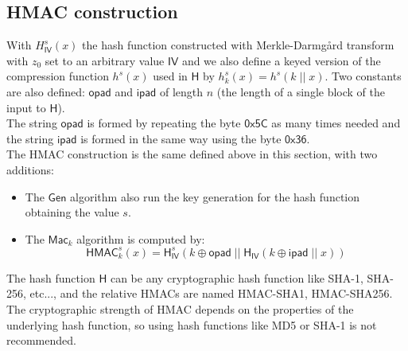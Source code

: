 \subsection{HMAC construction}
With $H^s_{\mathsf{IV}}(x)$ the hash function constructed with Merkle-Darmg\r{a}rd transform with $z_0$ set to an arbitrary value $\mathsf{IV}$ and we also define a keyed version of the compression function $h^s(x)$ used in $\mathsf{H}$ by $h^s_k(x) = h^s(k\;||\;x)$. Two constants are also defined: $\mathsf{opad}$ and $\mathsf{ipad}$ of length $n$ (the length of a single block of the input to $\mathsf{H}$).\\
The string $\mathsf{opad}$ is formed by repeating the byte $\mathsf{0x5C}$ as many times needed and the string $\mathsf{ipad}$ is formed in the same way using the byte $\mathsf{0x36}$.\\
The HMAC construction is the same defined above in this section, with two additions:
\begin{itemize}
    \item{The $\mathsf{Gen}$ algorithm also run the key generation for the hash function obtaining the value $s$.}
    \item{The $\mathsf{Mac}_k$ algorithm is computed by:
$$
    \mathsf{HMAC}^s_k(x) = \mathsf{H}^s_\mathsf{IV}(k \oplus \mathsf{opad}\;||\;\mathsf{H}_\mathsf{IV}(k \oplus \mathsf{ipad}\;||\;x))
$$
        }
\end{itemize}
The hash function $\mathsf{H}$ can be any cryptographic hash function like SHA-1, SHA-256, etc..., and the relative HMACs are named HMAC-SHA1, HMAC-SHA256. The cryptographic strength of HMAC depends on the properties of the underlying hash function, so using hash functions like MD5 or SHA-1 is not recommended.
